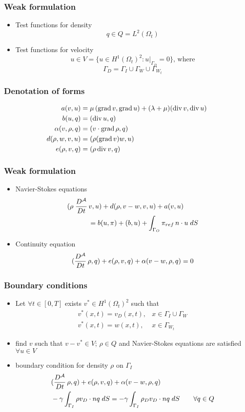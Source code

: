 \documentclass{beamer}
\begin{document}
\frame
{
	\frametitle{Weak formulation}
	\begin{itemize}
    	\item Test functions for density 
    		$$q\in Q\!=\!L^2(\Omega_t)$$
		\pause
    	\item Test functions for velocity
    		$$u\in V\!=\!\{u \in H^1(\Omega_t)^2 : u|_{\Gamma_D}=0\}, \,\mbox{where}$$
    		$$\Gamma_D=\Gamma_I \cup \Gamma_W \cup \Gamma_{W_t}$$
	\end{itemize}
}

\frame
{
	\frametitle{Denotation of forms}
	\[
	\begin{split}
	a(v,u) &= \mu\,(\mbox{grad}\,v,\mbox{grad}\,u) + (\lambda+\mu)(\mbox{div}\,v,\mbox{div}\,u) \\
	b(u,q) &= (\mbox{div}\,u,q) \\
	\alpha(v,\rho,q) &= (v \cdot \mbox{grad}\,\rho,q) \\
	d(\rho,w,v,u) &= (\rho(\mbox{grad}\,v)w,u) \\
	e(\rho,v,q) &= (\rho\,\mbox{div}\,v,q) \\
	\end{split}
	\]
}

\frame
{
	\frametitle{Weak formulation}
	\begin{itemize}
    	\item Navier-Stokes equations
    	\[ 
		\begin{split}
			(\rho\; \frac{D^\mathcal A}{Dt}\, &v,u) + d(\rho,v-w,v,u) + a(v,u) \\
			&=b(u,\pi) + (b,u) + \int_{\Gamma_O}{\pi_{ref}\,n \cdot u}\;dS
		\end{split}
		\]
    	\item Continuity equation
		$$(\frac{D^\mathcal A}{Dt}\, \rho,q) + e(\rho,v,q) + \alpha(v-w,\rho,q) = 0$$
	\end{itemize}
}

\frame
{
	\frametitle{Boundary conditions}
	\begin{itemize}
    	\item Let $\forall t\in[0,T]$ exists $v^* \in H^1(\Omega_t)^2$ such that
		\[
		\begin{array}{ll}
			v^*(x,t)=v_D(x,t), &x \in \Gamma_I \cup \Gamma_W \\
			v^*(x,t)=w(x,t), &x \in \Gamma_{W_t}
		\end{array}
		\]    	
		\pause
		\item find $v$ such that $v - v^* \in V$; $\rho \in Q$ and Navier-Stokes
		equations are satisfied $\forall u \in V$
		\pause
		\item boundary condition for density $\rho$ on $\Gamma_I$  
		\[
		\begin{split}
			&(\frac{D^\mathcal A}{Dt}\, \rho,q) + e(\rho,v,q) + \alpha(v-w,\rho,q) \\
			&- \gamma \int_{\Gamma_I}{\rho v_D \cdot nq}\;dS = 
			- \gamma \int_{\Gamma_I}{\rho_D v_D \cdot nq}\;dS \qquad \forall q\in Q
		\end{split}
		\]
  	\end{itemize}
}
\end{document}
